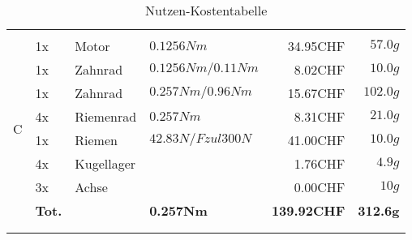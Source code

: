 \begin{longtable}{p{0.5cm}p{0.8cm}lp{3cm}rr}
          &       &                 &                      &          &  \\
        \multirow{8}[2]{*}{C} 
          & 1x    & Motor           & $0.1256 Nm$          & 34.95CHF & $57.0 g$ \\
          & 1x    & Zahnrad         & $0.1256 Nm / 0.11 Nm$& 8.02CHF  & $10.0 g$ \\
          & 1x    & Zahnrad         & $0.257 Nm / 0.96 Nm$ & 15.67CHF & $102.0 g$ \\
          & 4x    & Riemenrad       & $0.257 Nm$           & 8.31CHF  & $21.0 g$ \\
          & 1x    & Riemen          & $42.83 N /Fzul 300 N $ & 41.00CHF & $10.0 g$ \\
          & 4x    & Kugellager      &                      & 1.76CHF  & $4.9 g$ \\
          & 3x    & Achse           &                      & 0.00CHF  & $10 g$ \\
          & \textbf{Tot.} &       & \textbf{0.257Nm} & \textbf{139.92CHF} & \textbf{312.6g} \\
          &       &                 &                      &          &  \\
      \caption{Nutzen-Kostentabelle}       
      \label{tab:addlabel}
    \end{longtable}